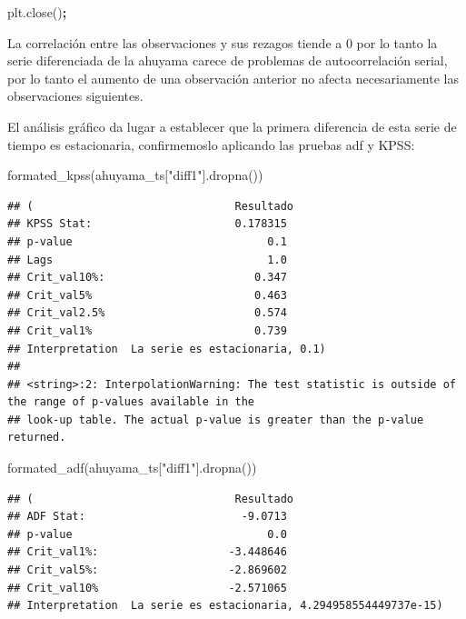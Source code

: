 \documentclass[
]{book}
\newenvironment{Shaded}{\begin{snugshade}}{\end{snugshade}}
\newcommand{\NormalTok}[1]{#1}
\newcommand{\OperatorTok}[1]{\textcolor[rgb]{0.81,0.36,0.00}{\textbf{#1}}}
\newcommand{\StringTok}[1]{\textcolor[rgb]{0.31,0.60,0.02}{#1}}
\begin{document}
\begin{Shaded}
\begin{Highlighting}[]
\NormalTok{plt.close()}\OperatorTok{;}
\end{Highlighting}
\end{Shaded}

La correlación entre las observaciones y sus rezagos tiende a 0 por lo tanto la serie diferenciada de la ahuyama carece de problemas de autocorrelación serial, por lo tanto el aumento de una observación anterior no afecta necesariamente las observaciones siguientes.

El análisis gráfico da lugar a establecer que la primera diferencia de esta serie de tiempo es estacionaria, confirmemoslo aplicando las pruebas adf y KPSS:

\begin{Shaded}
\begin{Highlighting}[]

\NormalTok{formated\_kpss(ahuyama\_ts[}\StringTok{"diff1"}\NormalTok{].dropna())}
\end{Highlighting}
\end{Shaded}

\begin{verbatim}
## (                               Resultado
## KPSS Stat:                      0.178315
## p-value                              0.1
## Lags                                 1.0
## Crit_val10%:                       0.347
## Crit_val5%                         0.463
## Crit_val2.5%                       0.574
## Crit_val1%                         0.739
## Interpretation  La serie es estacionaria, 0.1)
## 
## <string>:2: InterpolationWarning: The test statistic is outside of the range of p-values available in the
## look-up table. The actual p-value is greater than the p-value returned.
\end{verbatim}

\begin{Shaded}
\begin{Highlighting}[]
\NormalTok{formated\_adf(ahuyama\_ts[}\StringTok{"diff1"}\NormalTok{].dropna())}
\end{Highlighting}
\end{Shaded}

\begin{verbatim}
## (                               Resultado
## ADF Stat:                        -9.0713
## p-value                              0.0
## Crit_val1%:                    -3.448646
## Crit_val5%:                    -2.869602
## Crit_val10%                    -2.571065
## Interpretation  La serie es estacionaria, 4.294958554449737e-15)
\end{verbatim}
\end{document}
